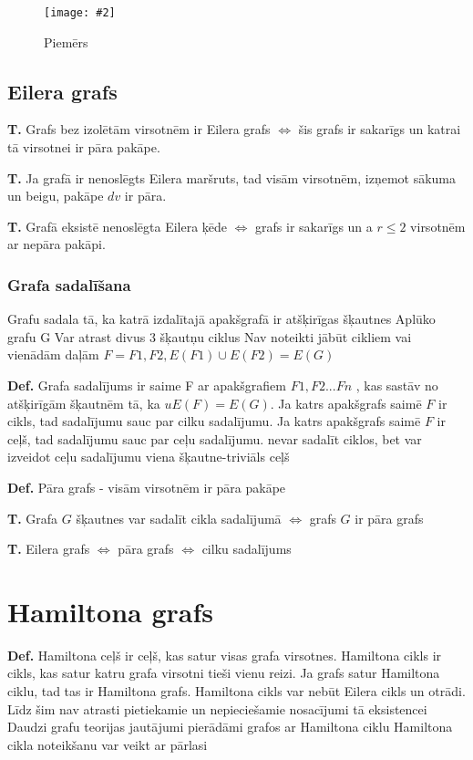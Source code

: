 \documentclass{article}
\newcommand{\illustration}[3]{
	\begin{figure}[H]
		\centering	
		\texttt{[image: \#2]}
		\caption{#3}
	\end{figure}
}
\begin{document}
\illustration{1}{Euler_cycle_build-1}{Piemērs}

\subsection{Eilera grafs}

\textbf{T. } Grafs bez izolētām virsotnēm ir Eilera grafs $\Leftrightarrow $ šis grafs ir sakarīgs un katrai tā virsotnei ir pāra pakāpe.

\textbf{T. } Ja grafā ir nenoslēgts Eilera maršruts, tad visām virsotnēm, izņemot sākuma un beigu, pakāpe $dv$ ir pāra.

\textbf{T. } Grafā eksistē nenoslēgta Eilera ķēde $⇔$ grafs ir sakarīgs un a $r \le 2$ virsotnēm ar nepāra pakāpi.

\subsubsection{Grafa sadalīšana}

Grafu sadala tā, ka katrā izdalītajā apakšgrafā ir atšķirīgas šķautnes Aplūko grafu G Var atrast divus 3 šķautņu ciklus Nav noteikti jābūt cikliem vai vienādām daļām $F = F1 , F2 , E (F1 ) \cup E (F2 ) = E (G )$

\textbf{Def.}  Grafa sadalījums ir saime F ar apakšgrafiem $F1 , F2 ...Fn$ , kas sastāv no atšķirīgām šķautnēm tā, ka $uE (F ) = E (G )$.  Ja katrs apakšgrafs saimē $F$ ir cikls, tad sadalījumu sauc par cilku sadalījumu. Ja katrs apakšgrafs saimē $F$ ir ceļš, tad sadalījumu sauc par ceļu sadalījumu.  nevar sadalīt ciklos, bet var izveidot ceļu sadalījumu viena šķautne-triviāls ceļš

\textbf{Def.}  Pāra grafs - visām virsotnēm ir pāra pakāpe

\textbf{T. } Grafa $G$ šķautnes var sadalīt cikla sadalījumā $\Leftrightarrow$ grafs $G$ ir pāra grafs

\textbf{T. } Eilera grafs $\Leftrightarrow$ pāra grafs $⇔$ cilku sadalījums

\section{Hamiltona grafs}

\textbf{Def.}  Hamiltona ceļš ir ceļš, kas satur visas grafa virsotnes.  Hamiltona cikls ir cikls, kas satur katru grafa virsotni tieši vienu reizi.  Ja grafs satur Hamiltona ciklu, tad tas ir Hamiltona grafs.  Hamiltona cikls var nebūt Eilera cikls un otrādi.  Līdz šim nav atrasti pietiekamie un nepieciešamie nosacījumi tā eksistencei Daudzi grafu teorijas jautājumi pierādāmi grafos ar Hamiltona ciklu Hamiltona cikla noteikšanu var veikt ar pārlasi
\end{document}
